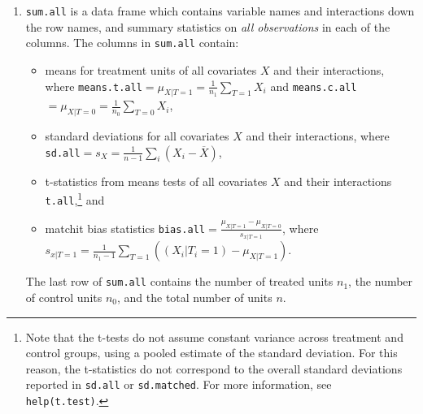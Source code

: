 \documentclass[oneside,letterpaper,titlepage]{article}
\begin{document}
\begin{enumerate}
\item \texttt{sum.all} is a data frame which contains variable names
  and interactions down the row names, and summary statistics on \emph{all
  observations} in each of the
  columns.  The columns in \texttt{sum.all} contain:
  \begin{itemize}
  \item means for treatment units of all covariates $X$ and their
    interactions, where \texttt{means.t.all}$= \mu_{X|T=1} =
    \frac{1}{n_1} \sum_{T=1} X_i$ and
    \texttt{means.c.all}$= \mu_{X|T=0} = \frac{1}{n_0} \sum_{T=0} X_i$,
  \item standard deviations for all covariates $X$ and their
    interactions, where \texttt{sd.all}$= s_X = \frac{1}{n-1}
    \sum_{i} (X_i - \overline{X})$,
  \item t-statistics from means tests of all covariates $X$ and their
    interactions \texttt{t.all},\footnote{Note that the t-tests do
      not assume constant variance across treatment and control
      groups, using a pooled estimate of the standard deviation.  For
      this reason, the t-statistics do not correspond to the overall standard
      deviations reported in \texttt{sd.all} or \texttt{sd.matched}.
      For more information, see \texttt{help(t.test)}.} and
  \item matchit bias statistics \texttt{bias.all}$=\frac{\mu_{X|T=1} -
      \mu_{X|T=0}}{s_{x|T=1}}$, where $s_{x|T=1} = \frac{1}{n_1-1}
    \sum_{T=1} ( (X_i|T_i=1) - \mu_{X|T=1})$.
  \end{itemize}
  The last row of \texttt{sum.all} contains the number of treated
  units $n_1$, the number of control units $n_0$, and the total number
  of units $n$. 


\end{enumerate}
\end{document}
